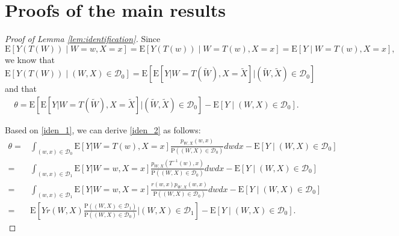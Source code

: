 \documentclass[11pt]{article}
\def\P{{\mathrm P}}
\def\E{{\mathrm E}}
\numberwithin{equation}{section}
\theoremstyle{definition}
\begin{document}
\section{Proofs of the main results}\label{sec:main-proof}
\begin{proof}[Proof of Lemma \ref{lem:identification}]
    Since
    \[\E[Y(T(W))\mid W=w,X=x]=\E[Y(T(w))\mid W=T(w),X=x]=\E[Y\mid W=T(w),X=x],\]
    we know that
    \[\E[Y(T(W))\mid (W,X)\in\mathcal{D}_0]=\E\left[\E\left[Y|W=T(\tilde{W}), X=\tilde{X}\right]|(\tilde{W},\tilde{X}) \in \mathcal{D}_0\right]\]
    and that
    \begin{align*}
        \theta=\E\left[\E\left[Y|W=T(\tilde{W}), X=\tilde{X}\right]|(\tilde{W},\tilde{X}) \in \mathcal{D}_0\right]-\E[Y\mid (W,X)\in\mathcal{D}_0].
    \end{align*}
    
    Based on \eqref{iden_1}, we can derive \eqref{iden_2} as follows:
    \begin{align*}
        \theta=&\int_{(w,x)\in\mathcal{D}_0}\E\left[Y|W=T(w), X=x\right]\frac{p_{W,X}(w,x)}{\P((W,X)\in\mathcal{D}_0)}dwdx-\E[Y\mid (W,X)\in\mathcal{D}_0]\\
        =&\int_{(w,x)\in\mathcal{D}_1}\E\left[Y|W=w, X=x\right]\frac{p_{W,X}(T^{-1}(w),x)}{\P((W,X)\in\mathcal{D}_0)}dwdx-\E[Y\mid (W,X)\in\mathcal{D}_0]\\
        =&\int_{(w,x)\in\mathcal{D}_1}\E\left[Y|W=w, X=x\right]\frac{r(w,x)p_{W,X}(w,x)}{\P((W,X)\in\mathcal{D}_0)}dwdx-\E[Y\mid (W,X)\in\mathcal{D}_0]\\
        =&\E\left[Yr(W,X)\frac{\P((W,X)\in\mathcal{D}_1)}{\P((W,X)\in\mathcal{D}_0)}|(W,X) \in \mathcal{D}_1\right]-\E[Y\mid (W,X)\in\mathcal{D}_0].
    \end{align*}
    

\end{proof}
\end{document}

